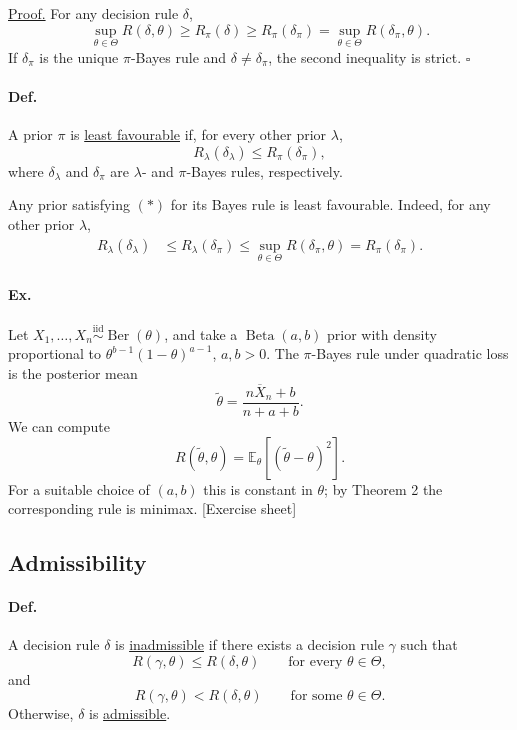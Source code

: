 \documentclass[11pt,a4paper]{article}
\begin{document}
\medskip
\noindent\underline{Proof.}\quad
For any decision rule $\delta$,
\[
\sup_{\theta\in\Theta}R(\delta,\theta)
\geq R_\pi(\delta)
\geq R_\pi(\delta_\pi)
=\sup_{\theta\in\Theta}R(\delta_\pi,\theta).
\]
If $\delta_\pi$ is the unique $\pi$-Bayes rule and
$\delta\ne\delta_\pi$, the second inequality is strict.
\hfill$\square$

\paragraph{Def.}
A prior $\pi$ is \underline{least favourable} if, for every other prior
$\lambda$,
\[
R_\lambda(\delta_\lambda)\leq R_\pi(\delta_\pi),
\]
where $\delta_\lambda$ and $\delta_\pi$ are $\lambda$- and $\pi$-Bayes
rules, respectively.

Any prior satisfying $(*)$ for its Bayes rule is least favourable.
Indeed, for any other prior $\lambda$,
\[
\begin{aligned}
R_\lambda(\delta_\lambda)
&\leq R_\lambda(\delta_\pi)
\leq\sup_{\theta\in\Theta}R(\delta_\pi,\theta)
=R_\pi(\delta_\pi).
\end{aligned}
\]

\paragraph{Ex.}
Let $X_1,\ldots,X_n\overset{\mathrm{iid}}\sim\operatorname{Ber}(\theta)$,
and take a $\operatorname{Beta}(a,b)$ prior with density proportional to
$\theta^{b-1}(1-\theta)^{a-1}$, $a,b>0$.
The $\pi$-Bayes rule under quadratic loss is the posterior mean
\[
\widetilde\theta=\frac{n\overline X_n+b}{n+a+b}.
\]
We can compute
\[
R(\widetilde\theta,\theta)
=\mathbb E_\theta[(\widetilde\theta-\theta)^2].
\]
For a suitable choice of $(a,b)$ this is constant in $\theta$;
by Theorem 2 the corresponding rule is minimax.
\hfill[Exercise sheet]

\subsection*{Admissibility}

\paragraph{Def.}
A decision rule $\delta$ is \underline{inadmissible} if there exists a
decision rule $\gamma$ such that
\[
R(\gamma,\theta)\leq R(\delta,\theta)
\qquad\text{for every }\theta\in\Theta,
\]
and
\[
R(\gamma,\theta)<R(\delta,\theta)
\qquad\text{for some }\theta\in\Theta.
\]
Otherwise, $\delta$ is \underline{admissible}.
\end{document}
